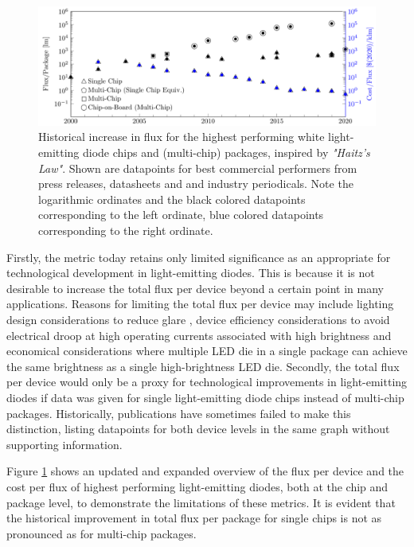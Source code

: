 \documentclass[a4paper,nocompress]{spie}  %
\begin{document}
    \begin{figure} [ht]
        \begin{center}
            \includegraphics[width=\textwidth]{haitz_law_white.pdf}
        \end{center}
        \caption{Historical increase in flux for the highest performing white light-emitting diode chips and (multi-chip) packages, inspired by \textit{"Haitz's Law"}\cite{haitz1999case}. Shown are datapoints for best commercial performers from press releases, datasheets and and industry periodicals. Note the logarithmic ordinates and the black colored datapoints corresponding to the left ordinate, blue colored datapoints corresponding to the right ordinate.}
        \label{fig:haitz}
    \end{figure}
    
    Firstly, the metric today retains only limited significance as an appropriate for technological development in light-emitting diodes. This is because it is not desirable to increase the total flux per device beyond a certain point in many applications. Reasons for limiting the total flux per device may include lighting design considerations to reduce glare \cite{khan2015led}, device efficiency considerations to avoid electrical droop at high operating currents associated with high brightness \cite{Piprek2010} and economical considerations where multiple LED die in a single package can achieve the same brightness as a single high-brightness LED die. Secondly, the total flux per device would only be a proxy for technological improvements in light-emitting diodes if data was given for single light-emitting diode chips instead of multi-chip packages. Historically, publications have sometimes failed to make this distinction, listing datapoints for both device levels in the same graph without supporting information.

    Figure \ref{fig:haitz} shows an updated and expanded overview of the flux per device and the cost per flux of highest performing light-emitting diodes, both at the chip and package level, to demonstrate the limitations of these metrics. It is evident that the historical improvement in total flux per package for single chips is not as pronounced as for multi-chip packages.
\end{document}
